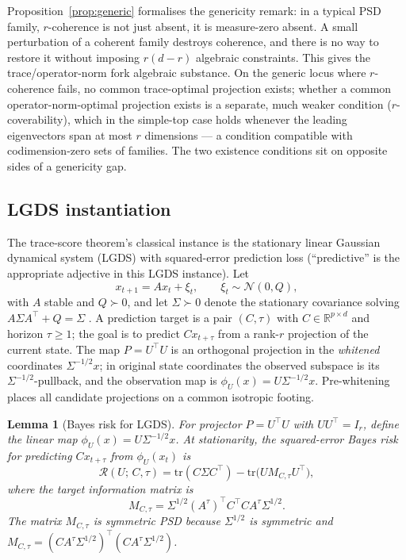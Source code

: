 \documentclass[final,3p,times]{elsarticle}
\newtheorem{lemma}[theorem]{Lemma}
\newcommand{\tr}{\mathrm{tr}}
\newcommand{\R}{\mathbb{R}}
\begin{document}
\noindent
Proposition~\ref{prop:generic} formalises the genericity remark: in a
typical PSD family, $r$-coherence is not just absent, it is
measure-zero absent.
A small perturbation of a coherent family destroys coherence, and
there is no way to restore it without imposing $r(d-r)$ algebraic
constraints.
This gives the trace/operator-norm fork algebraic substance.
On the generic locus where $r$-coherence fails, no common trace-optimal
projection exists; whether a common operator-norm-optimal projection
exists is a separate, much weaker condition ($r$-coverability), which
in the simple-top case holds whenever the leading eigenvectors span at
most $r$ dimensions --- a condition compatible with codimension-zero
sets of families.
The two existence conditions sit on opposite sides of a genericity
gap.

\subsection{LGDS instantiation}

The trace-score theorem's classical instance is the stationary linear
Gaussian dynamical system (LGDS) with squared-error prediction loss
(``predictive'' is the appropriate adjective in this LGDS instance).
Let
\begin{equation}
x_{t+1} = A x_t + \xi_t, \qquad \xi_t\sim\mathcal{N}(0,Q),
\end{equation}
with $A$ stable and $Q\succ 0$, and let $\Sigma\succ 0$ denote the
stationary covariance solving $A\Sigma A^\top+Q=\Sigma$ \cite{Kailath1980}.
A prediction target is a pair $(C,\tau)$ with $C\in\R^{p\times d}$ and
horizon $\tau\ge 1$; the goal is to predict $Cx_{t+\tau}$ from a rank-$r$
projection of the current state.
The map $P=U^\top U$ is an orthogonal projection in the
\emph{whitened} coordinates $\Sigma^{-1/2}x$; in original state
coordinates the observed subspace is its $\Sigma^{-1/2}$-pullback,
and the observation map is $\phi_U(x)=U\Sigma^{-1/2}x$.
Pre-whitening places all candidate projections on a common isotropic
footing.

\begin{lemma}[Bayes risk for LGDS]\label{lem:bayes}
For projector $P=U^\top U$ with $UU^\top=I_r$, define the linear map
$\phi_U(x)=U\Sigma^{-1/2}x$.
At stationarity, the squared-error Bayes risk for predicting $Cx_{t+\tau}$
from $\phi_U(x_t)$ is
\begin{equation}\label{eq:lgdsbayes}
\mathcal{R}(U;\,C,\tau)
= \tr(C\Sigma C^\top) - \tr\!\bigl(U M_{C,\tau} U^\top\bigr),
\end{equation}
where the \emph{target information matrix} is
\begin{equation}\label{eq:M}
M_{C,\tau} = \Sigma^{1/2}(A^\tau)^\top C^\top C A^\tau \Sigma^{1/2}.
\end{equation}
The matrix $M_{C,\tau}$ is symmetric PSD because $\Sigma^{1/2}$ is
symmetric and $M_{C,\tau}=(CA^\tau\Sigma^{1/2})^\top(CA^\tau\Sigma^{1/2})$.
\end{lemma}
\end{document}
